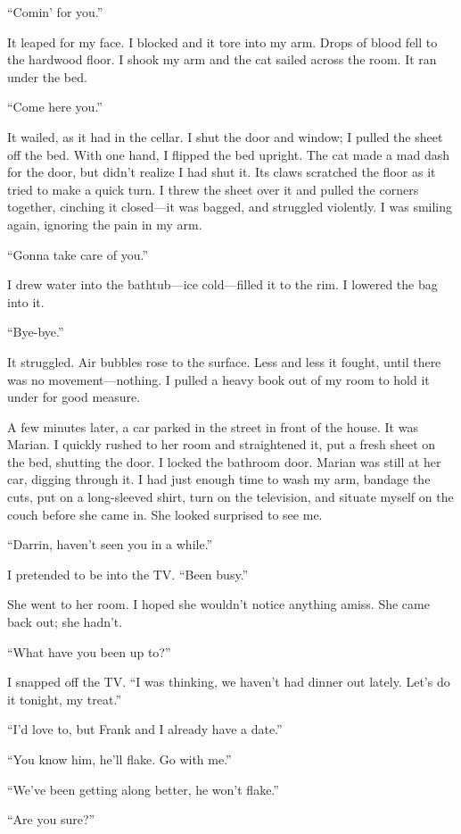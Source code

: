 \documentclass[
]{article}
\begin{document}
``Comin' for you.''

It leaped for my face. I blocked and it tore into my arm. Drops of blood
fell to the hardwood floor. I shook my arm and the cat sailed across the
room. It ran under the bed.

``Come here you.''

It wailed, as it had in the cellar. I shut the door and window; I pulled
the sheet off the bed. With one hand, I flipped the bed upright. The cat
made a mad dash for the door, but didn't realize I had shut it. Its
claws scratched the floor as it tried to make a quick turn. I threw the
sheet over it and pulled the corners together, cinching it closed---it
was bagged, and struggled violently. I was smiling again, ignoring the
pain in my arm.

``Gonna take care of you.''

I drew water into the bathtub---ice cold---filled it to the rim. I
lowered the bag into it.

``Bye-bye.''

It struggled. Air bubbles rose to the surface. Less and less it fought,
until there was no movement---nothing. I pulled a heavy book out of my
room to hold it under for good measure.

A few minutes later, a car parked in the street in front of the house.
It was Marian. I quickly rushed to her room and straightened it, put a
fresh sheet on the bed, shutting the door. I locked the bathroom door.
Marian was still at her car, digging through it. I had just enough time
to wash my arm, bandage the cuts, put on a long-sleeved shirt, turn on
the television, and situate myself on the couch before she came in. She
looked surprised to see me.

``Darrin, haven't seen you in a while.''

I pretended to be into the TV. ``Been busy.''

She went to her room. I hoped she wouldn't notice anything amiss. She
came back out; she hadn't.

``What have you been up to?''

I snapped off the TV. ``I was thinking, we haven't had dinner out
lately. Let's do it tonight, my treat.''

``I'd love to, but Frank and I already have a date.''

``You know him, he'll flake. Go with me.''

``We've been getting along better, he won't flake.''

``Are you sure?''
\end{document}
